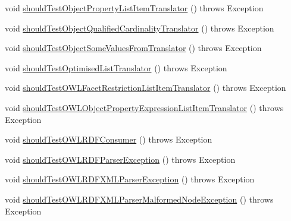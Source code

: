 \begin{DoxyCompactItemize}
\item 
void \hyperlink{classorg_1_1semanticweb_1_1owlapi_1_1contract_1_1_contract_rdfxml_parser_test_a37195f10ec276cefd0d6aa8766f8dbfc}{should\-Test\-Object\-Property\-List\-Item\-Translator} ()  throws Exception 
\item 
void \hyperlink{classorg_1_1semanticweb_1_1owlapi_1_1contract_1_1_contract_rdfxml_parser_test_aba0163d307f57825c3880692167bad0b}{should\-Test\-Object\-Qualified\-Cardinality\-Translator} ()  throws Exception 
\item 
void \hyperlink{classorg_1_1semanticweb_1_1owlapi_1_1contract_1_1_contract_rdfxml_parser_test_a0a6fc6b01c37b47a3b44a785bee5a580}{should\-Test\-Object\-Some\-Values\-From\-Translator} ()  throws Exception 
\item 
void \hyperlink{classorg_1_1semanticweb_1_1owlapi_1_1contract_1_1_contract_rdfxml_parser_test_a1a07a208f283151acd6979191c10edd5}{should\-Test\-Optimised\-List\-Translator} ()  throws Exception 
\item 
void \hyperlink{classorg_1_1semanticweb_1_1owlapi_1_1contract_1_1_contract_rdfxml_parser_test_a5392d2e000155f5d233554cc7ecc7775}{should\-Test\-O\-W\-L\-Facet\-Restriction\-List\-Item\-Translator} ()  throws Exception 
\item 
void \hyperlink{classorg_1_1semanticweb_1_1owlapi_1_1contract_1_1_contract_rdfxml_parser_test_a40fb72cce03f5fee8376f86b9c75b8b1}{should\-Test\-O\-W\-L\-Object\-Property\-Expression\-List\-Item\-Translator} ()  throws Exception 
\item 
void \hyperlink{classorg_1_1semanticweb_1_1owlapi_1_1contract_1_1_contract_rdfxml_parser_test_ad26e04eb6d0554b8dc97e81365ef8936}{should\-Test\-O\-W\-L\-R\-D\-F\-Consumer} ()  throws Exception 
\item 
void \hyperlink{classorg_1_1semanticweb_1_1owlapi_1_1contract_1_1_contract_rdfxml_parser_test_ad4df3eb44bf700e543d3a53b06c6a416}{should\-Test\-O\-W\-L\-R\-D\-F\-Parser\-Exception} ()  throws Exception 
\item 
void \hyperlink{classorg_1_1semanticweb_1_1owlapi_1_1contract_1_1_contract_rdfxml_parser_test_acd316059234f669f6da9815661ea5dfa}{should\-Test\-O\-W\-L\-R\-D\-F\-X\-M\-L\-Parser\-Exception} ()  throws Exception 
\item 
void \hyperlink{classorg_1_1semanticweb_1_1owlapi_1_1contract_1_1_contract_rdfxml_parser_test_a5e7e27f03f381f0ffaa786dcf6d8fb9a}{should\-Test\-O\-W\-L\-R\-D\-F\-X\-M\-L\-Parser\-Malformed\-Node\-Exception} ()  throws Exception 
\item 

\end{DoxyCompactItemize}
